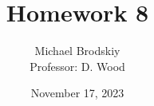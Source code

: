 


\title{Homework 8}
\date{November 17, 2023}
\author{Michael Brodskiy\\ \small Professor: D. Wood}



\maketitle


